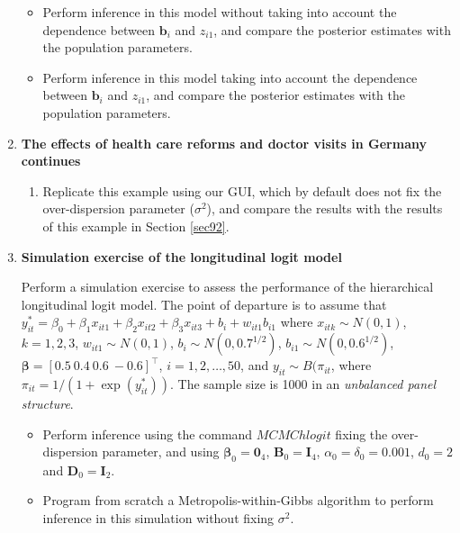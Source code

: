 \begin{enumerate}
	\begin{itemize}
		\item Perform inference in this model without taking into account the dependence between $\bm{b}_i$ and $z_{i1}$, and compare the posterior estimates with the population parameters.
		\item Perform inference in this model taking into account the dependence between $\bm{b}_i$ and $z_{i1}$, and compare the posterior estimates with the population parameters. 
	\end{itemize}

\item \textbf{The effects of health care reforms and doctor visits in Germany continues}

\begin{enumerate}
	\item Replicate this example using our GUI, which by default does not fix the over-dispersion parameter ($\sigma^2$), and compare the results with the results of this example in Section \ref{sec92}.
\end{enumerate}

\item \textbf{Simulation exercise of the longitudinal logit model}

Perform a simulation exercise to assess the performance of the hierarchical longitudinal logit model. The point of departure is to assume that $y_{it}^*=\beta_0+\beta_1x_{it1}+\beta_2x_{it2}+\beta_3x_{it3}+b_i+w_{it1}b_{i1}$ where $x_{itk}\sim N(0,1)$, $k=1,2,3$, $w_{it1}\sim N(0,1)$, $b_i\sim N(0, 0.7^{1/2})$, $b_{i1}\sim N(0, 0.6^{1/2})$, $\bm{\beta}=[0.5 \ 0.4 \ 0.6 \ -0.6]^{\top}$, $i=1,2,\dots,50$, and $y_{it}\sim B(\pi_{it}$, where $\pi_{it}=1/(1+\exp(y_{it}^*))$. The sample size is 1000 in an \textit{unbalanced panel structure}.

\begin{itemize}
	\item Perform inference using the command $MCMChlogit$ fixing the over-dispersion parameter, and using $\bm{\beta}_0=\bm{0}_4$, $\bm{B}_0=\bm{I}_4$, $\alpha_0=\delta_0=0.001$, $d_0=2$ and $\bm{D}_0=\bm{I}_2$.
	\item Program from scratch a Metropolis-within-Gibbs algorithm to perform inference in this simulation without fixing $\sigma^2$.  
\end{itemize} 


	
	
	
\end{enumerate}
